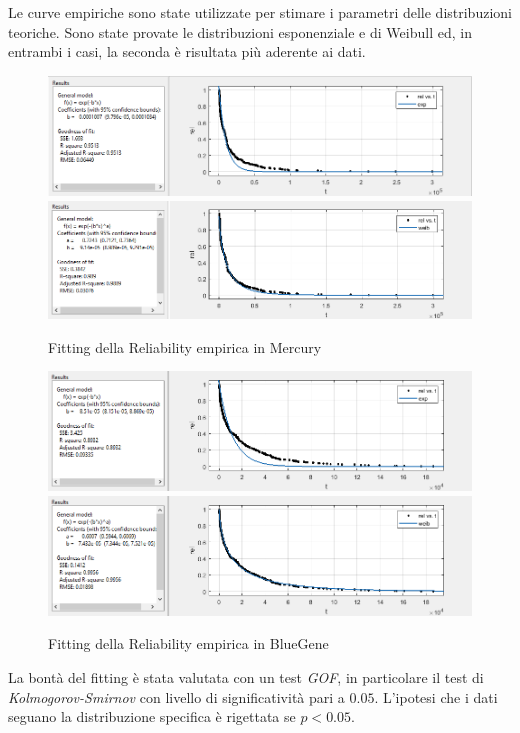 	Le curve empiriche sono state utilizzate per stimare i parametri delle distribuzioni teoriche. Sono state provate le distribuzioni esponenziale e di Weibull ed, in entrambi i casi, la seconda è risultata più aderente ai dati.
	\begin{figure}[H]
		\centering
		\includegraphics[scale=0.6]{./immagine/expM.png}
		\includegraphics[scale=0.6]{./immagine/weibM.png}
		\caption{Fitting della Reliability empirica in Mercury}
		\label{fig:ffda-distrM}
	\end{figure}
	\begin{figure}[H]
		\centering
		\includegraphics[scale=0.6]{./immagine/expBG.png}
		\includegraphics[scale=0.6]{./immagine/weibBG.png}
		\caption{Fitting della Reliability empirica in BlueGene}
		\label{fig:ffda-distrBG}
	\end{figure}
	La bontà del fitting è stata valutata con un test \emph{GOF}, in particolare il test di \emph{Kolmogorov-Smirnov} con livello di significatività pari a $0.05$. L'ipotesi che i dati seguano la distribuzione specifica è rigettata se $p<0.05$.
